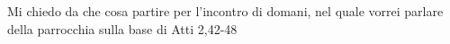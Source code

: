 \author{Daniele Gianotti}
Mi chiedo da che cosa partire per l’incontro di domani, nel quale vorrei parlare della parrocchia sulla base di Atti 2,42-48
